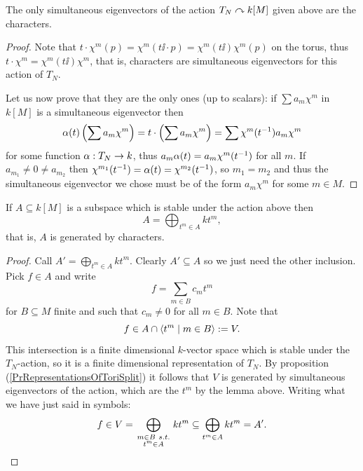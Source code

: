 \begin{lemma}[]\label{LmSimultaneousEigenvectorsForActionOfTorusAreTheCharacters}
The only simultaneous eigenvectors of the action $T_N\curvearrowright k[M]$ given above are the characters.
\end{lemma}
\begin{proof}
Note that $t\cdot \chi^m (p)=\chi^m(t\ii\cdot p)=\chi^m(t\ii)\chi^m(p)$ on the torus, thus $t\cdot \chi^m=\chi^m(t\ii) \chi^m$, that is, characters are simultaneous eigenvectors for this action of $T_N$. 

Let us now prove that they are the only ones (up to scalars):
if $\sum a_m \chi^m$ in $k[M]$ is a simultaneous eigenvector then 
\[\alpha(t)\left({\sum a_m \chi^m}\right)=t\cdot \left({\sum a_m \chi^m}\right)=\sum \chi^m(t^{-1})a_m \chi^m\]
for some function $\alpha:T_N\to k$, thus $a_m\alpha(t)=a_m\chi^m(t^{-1})$ for all $m$. If $a_{m_1}\neq 0\neq a_{m_2}$ then $\chi^{m_1}(t^{-1})=\alpha(t)=\chi^{m_2}(t^{-1})$, so $m_1=m_2$ and thus the simultaneous eigenvector we chose must be of the form $a_m \chi^m$ for some $m\in M$.
\end{proof}

\begin{lemma}
If $A\subseteq k[M]$ is a subspace which is stable under the action above then
\[A=\bigoplus_{t^m\in A}k t^m,\]
that is, $A$ is generated by characters.
\end{lemma}
\begin{proof}
Call $A'=\bigoplus_{t^m\in A}k t^m$. Clearly $A'\subseteq A$ so we just need the other inclusion. Pick $f\in A$ and write
\[f=\sum_{m\in B}c_m t^m\]
for $B\subseteq M$ finite and such that $c_m\neq 0$ for all $m\in B$. Note that
\[f\in A\cap \left\langle {t^m\mid m\in B}\right\rangle:=V.\]
This intersection is a finite dimensional $k$-vector space which is stable under the $T_N$-action, so it is a finite dimensional representation of $T_N$. By proposition (\ref{PrRepresentationsOfToriSplit}) it follows that $V$ is generated by simultaneous eigenvectors of the action, which are the $t^m$ by the lemma above. Writing what we have just said in symbols: 
\[f\in V=\bigoplus_{\begin{smallmatrix}m\in B\ s.t.\\ t^m\in A\end{smallmatrix}}kt^m\subseteq \bigoplus_{t^m\in A}k t^m=A'.\]
\end{proof}

